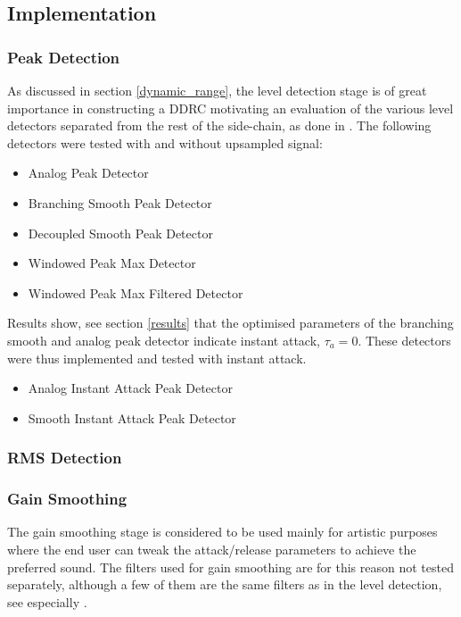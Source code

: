 \documentclass[../main2.tex]{subfiles}
\begin{document}
\subsection{Implementation} \label{method_implementation}
\subsubsection{Peak Detection}
As discussed in section \ref{dynamic_range}, the level detection stage is of great importance in constructing a DDRC motivating an evaluation of the various level detectors separated from the rest of the side-chain, as done in \cite{reiss2012tutorial}. The following detectors were tested with and without upsampled signal:
\begin{itemize}
\item{Analog Peak Detector} 
\item{Branching Smooth Peak Detector}
\item{Decoupled Smooth Peak Detector}
\item{Windowed Peak Max Detector}
\item{Windowed Peak Max Filtered Detector}
\end{itemize}
Results show, see section \ref{results} that the optimised parameters of the branching smooth and analog peak detector indicate instant attack, $\tau_a = 0$. These detectors were thus implemented and tested with instant attack.

\begin{itemize}
\item{Analog Instant Attack Peak Detector}
\item{Smooth Instant Attack Peak Detector}
\end{itemize}

\subsubsection{RMS Detection}

\subsubsection{Gain Smoothing}
The gain smoothing stage is considered to be used mainly for artistic purposes where the end user can tweak the attack/release parameters to achieve the preferred sound. The filters used for gain smoothing are for this reason not tested separately, although a few of them are the same filters as in the level detection, see especially \cite{reiss2012tutorial}.
\end{document}
